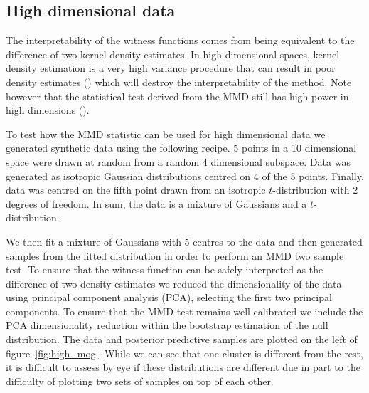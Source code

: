\documentclass{article} %
\begin{document}
\subsection{High dimensional data}

The interpretability of the witness functions comes from being equivalent to the difference of two kernel density estimates.
In high dimensional spaces, kernel density estimation is a very high variance procedure that can result in poor density estimates () which will destroy the interpretability of the method.
Note however that the statistical test derived from the MMD still has high power in high dimensions ().

To test how the MMD statistic can be used for high dimensional data we generated synthetic data using the following recipe.
5 points in a 10 dimensional space were drawn at random from a random 4 dimensional subspace\footnotemark.
Data was generated as isotropic Gaussian distributions centred on 4 of the 5 points.
Finally, data was centred on the fifth point drawn from an isotropic $t$-distribution with 2 degrees of freedom.
In sum, the data is a mixture of Gaussians and a $t$-distribution.

We then fit a mixture of Gaussians with 5 centres to the data and then generated samples from the fitted distribution in order to perform an MMD two sample test.
To ensure that the witness function can be safely interpreted as the difference of two density estimates we reduced the dimensionality of the data using principal component analysis (PCA), selecting the first two principal components.
To ensure that the MMD test remains well calibrated we include the PCA dimensionality reduction within the bootstrap estimation of the null distribution.
The data and posterior predictive samples are plotted on the left of figure~\ref{fig:high_mog}.
While we can see that one cluster is different from the rest, it is difficult to assess by eye if these distributions are different due in part to the difficulty of plotting two sets of samples on top of each other.
\end{document}
